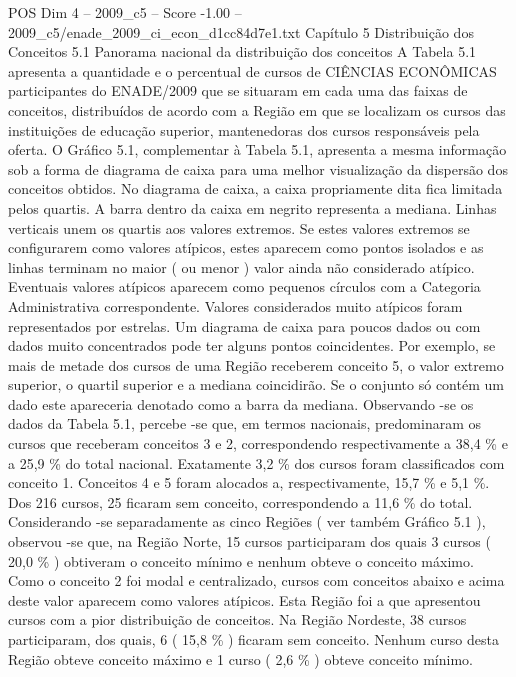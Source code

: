 \begin{textsample}{POS Dim 4 – 2009\_c5 – Score -1.00 – 2009\_c5/enade\_2009\_ci\_econ\_d1cc84d7e1.txt}  \label{ex:f4_pos_259}
Capítulo 5 Distribuição dos Conceitos 5.1 Panorama nacional da distribuição dos conceitos A Tabela 5.1 apresenta a quantidade e o percentual de cursos de CIÊNCIAS ECONÔMICAS participantes do ENADE/2009 que se situaram em cada uma das faixas de conceitos, distribuídos de acordo com a Região em que se localizam os cursos das instituições de educação superior, mantenedoras dos cursos responsáveis pela oferta.
O Gráfico 5.1, complementar à Tabela 5.1, apresenta a mesma informação sob a forma de diagrama de caixa para uma melhor visualização da dispersão dos conceitos obtidos.
No diagrama de caixa, a caixa propriamente dita fica limitada pelos quartis.
A barra dentro da caixa em negrito representa a mediana.
Linhas verticais unem os quartis aos valores extremos.
Se estes valores extremos se configurarem como valores atípicos, estes aparecem como pontos isolados e as linhas terminam no maior ( ou menor ) valor ainda não considerado atípico.
Eventuais valores atípicos aparecem como pequenos círculos com a Categoria Administrativa correspondente.
Valores considerados muito atípicos foram representados por estrelas.
Um diagrama de caixa para poucos dados ou com dados muito concentrados pode ter alguns pontos coincidentes.
Por exemplo, se mais de metade dos cursos de uma Região receberem conceito 5, o valor extremo superior, o quartil superior e a mediana coincidirão.
Se o conjunto só contém um dado este apareceria denotado como a barra da mediana.
Observando -se os dados da Tabela 5.1, percebe -se que, em termos nacionais, predominaram os cursos que receberam conceitos 3 e 2, correspondendo respectivamente a 38,4 \% e a 25,9 \% do total nacional.
Exatamente 3,2 \% dos cursos foram classificados com conceito 1.
Conceitos 4 e 5 foram alocados a, respectivamente, 15,7 \% e 5,1 \%.
Dos 216 cursos, 25 ficaram sem conceito, correspondendo a 11,6 \% do total.
Considerando -se separadamente as cinco Regiões ( ver também Gráfico 5.1 ), observou -se que, na Região Norte, 15 cursos participaram dos quais 3 cursos ( 20,0 \% ) obtiveram o conceito mínimo e nenhum obteve o conceito máximo.
Como o conceito 2 foi modal e centralizado, cursos com conceitos abaixo e acima deste valor aparecem como valores atípicos.
Esta Região foi a que apresentou cursos com a pior distribuição de conceitos.
Na Região Nordeste, 38 cursos participaram, dos quais, 6 ( 15,8 \% ) ficaram sem conceito.
Nenhum curso desta Região obteve conceito máximo e 1 curso ( 2,6 \% ) obteve conceito mínimo.

\end{textsample}
